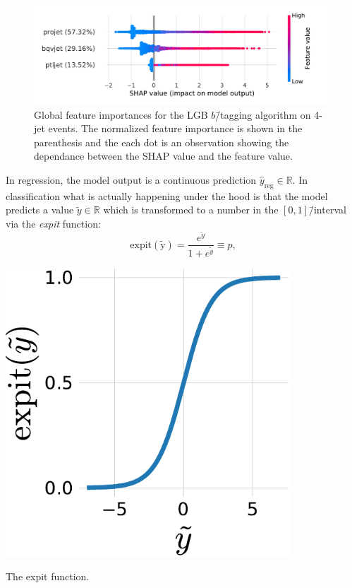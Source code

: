\begin{figure}[h!]
  \centerfloat
  \includegraphics[width=0.98\textwidth, trim=10 10 20 10, clip]{figures/quarks/shap_global-down_sample=1.00-ML_vars=vertex-selection=b-ejet_min=4-n_iter_RS_lgb=99-n_iter_RS_xgb=9-cdot_cut=0.90-version=19-njet=4.pdf}
  \caption[Global Feature Importances for the LGB $b$\=/Tagging Algorithm on 4-Jet Events]
          {Global feature importances for the LGB $b$\=/tagging algorithm on 4-jet events. The normalized feature importance is shown in the parenthesis and the each dot is an observation showing the dependance between the SHAP value and the feature value. 
          } 
  \label{fig:q:shap_btag_global_4j}
\end{figure}



In regression, the model output is a continuous prediction ${\hat{y}_\mathrm{reg} \in \mathbb{R}}$. In classification what is actually happening under the hood is that the model predicts a value $\tilde{y} \in \mathbb{R}$ which is transformed to a number in the $[0, 1]$\=/interval via the \emph{expit} function:
\begin{equation}
    \label{eq:q:expit}
    \mathrm{expit(\tilde{y})} = \frac{e^{\tilde{y}}}{1+e^{\tilde{y}}} \equiv p,
\end{equation}

\begin{marginfigure}[-2.5cm]
  \centerfloat
  \includegraphics[width=0.8\textwidth]{figures/logit_expit/expit.pdf}
  \caption[The expit Function]
          {The expit function.} 
  \label{fig:q:expit}
\end{marginfigure}

